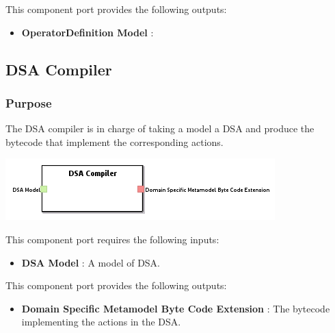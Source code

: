 \documentclass{gemoc} %
\begin{document}
This component port provides the following outputs:
\begin{itemize}
  \item \textbf{OperatorDefinition Model} :
\end{itemize}


\subsection{DSA Compiler}

\subsubsection{Purpose}
The DSA compiler is in charge of taking a model a DSA and produce the bytecode that implement the corresponding actions.


\begin{center}
\includegraphics*[trim=0.0cm 0.0cm 0cm 0.0cm, clip=true]{../images/generated/Generated_DSA_Compiler.png}
\end{center}

This component port requires the following inputs:
\begin{itemize}
  \item \textbf{DSA Model} :
A model of DSA.
\end{itemize}

This component port provides the following outputs:
\begin{itemize}
  \item \textbf{Domain Specific Metamodel Byte Code Extension} :
The bytecode implementing the actions in the DSA.
\end{itemize}


\end{document}
